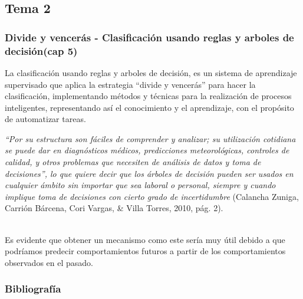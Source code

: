 \documentclass[10pt]{beamer}
\begin{document}
\subsection{Tema 2}
\begin{frame}
\frametitle{Divide y vencerás - Clasificación usando reglas y arboles de decisión(cap 5)}
La clasificación usando reglas y arboles de decisión, es un sistema de aprendizaje supervisado que aplica la estrategia ``divide y vencerás'' para hacer la clasificación, implementando métodos y técnicas para la realización de procesos inteligentes, representando así el conocimiento y el aprendizaje, con el propósito de automatizar tareas.

\textit{``Por su estructura son fáciles de comprender y analizar; su utilización cotidiana se puede dar en diagnósticos médicos, predicciones meteorológicas, controles de calidad, y otros problemas que necesiten de análisis de datos y toma de decisiones'', lo que quiere decir que los árboles de decisión pueden ser usados en cualquier ámbito sin importar que sea laboral o personal, siempre y cuando implique toma de decisiones con cierto grado de incertidumbre} (Calancha Zuniga, Carrión Bárcena, Cori Vargas, \& Villa Torres, 2010, pág. 2).

~\\Es evidente que obtener un mecanismo como este sería muy útil debido a que podríamos predecir comportamientos futuros a partir de los comportamientos observados en el pasado.
\end{frame}

\begin{frame}
  \frametitle{Bibliografía}
  
\nocite{A1, L, EyH}
  
  
  
\end{frame}
\end{document}
